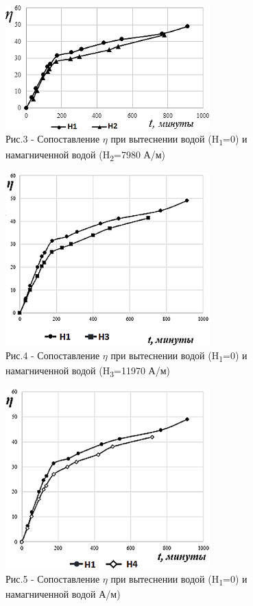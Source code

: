 \begin{figure}[H]
	\centering
	\includegraphics[width=0.7\textwidth]{media/gorn4/image4}
	\caption*{Рис.3 - Сопоставление \(\eta\) при вытеснении водой (H\textsubscript{1}=0) и намагниченной водой (H\textsubscript{2}=7980 А/м)}
\end{figure}

\begin{figure}[H]
	\centering
	\includegraphics[width=0.7\textwidth]{media/gorn4/image5}
	\caption*{Рис.4 - Сопоставление \(\eta\) при вытеснении водой (H\textsubscript{1}=0) и намагниченной водой (H\textsubscript{3}=11970 А/м)}
\end{figure}

\begin{figure}[H]
	\centering
	\includegraphics[width=0.7\textwidth]{media/gorn4/image6}
	\caption*{Рис.5 - Сопоставление \(\eta\) при вытеснении водой (H\textsubscript{1}=0) и намагниченной водой А/м)}
\end{figure}

